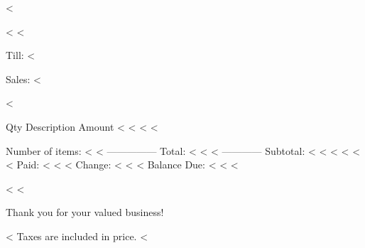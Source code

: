 <%

\begin{CJK}{UTF8}{arialuni}

<%
<%

 Till: <%

Sales: <%

<%

  Qty Description                 Amount
<%
<%
      <%
<%

Number of items: <%
<%
                         ---------------
                        Total: <%
<%
<%
                            ------------
                     Subtotal: <%
<%
<%
<%
<%
<%
                         Paid: <%
<%
<%
                       Change: <%
<%
<%
                  Balance Due: <%
<%
<%

<%
<%

   Thank you for your valued business!

<%
Taxes are included in price.
<%
\end{CJK}

